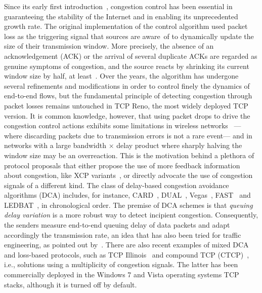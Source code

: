 \documentclass[english,times]{ettauth}
\begin{document}
Since its early first introduction~\cite{Jacobson96,rfc2581}, congestion
control has been essential in guaranteeing the stability of the Internet and
in enabling its unprecedented growth rate. The original implementation of the
control algorithm used packet loss as the triggering signal that sources are
aware~of to dynamically update the size of their transmission window. More
precisely, the absence of an acknowledgement (ACK) or the arrival of several
duplicate ACKs are regarded as genuine symptoms of congestion, and the source
reacts by shrinking its current window size by half, at least~\cite{rfc5681}.
Over the years, the algorithm has undergone several refinements and
modifications in order to control finely the dynamics of end-to-end flows, but
the fundamental principle of detecting congestion through packet losses
remains untouched in TCP Reno, the most widely deployed TCP version. It is
common knowledge, however, that using packet drops to drive the congestion
control actions exhibits some limitations in wireless
networks~\cite{lassila08:_perfor_tcp_low_wirel_links_delay_spikes} ---where
discarding packets due to transmission errors is not a rare event--- and in
networks with a large bandwidth $\times$ delay product where sharply halving
the window size may be an overreaction. This is the motivation behind a
plethora of protocol proposals that either propose the use of more feedback
information about congestion, like XCP
variants~\cite{Katabi02,xia05:_one_more_bit_enoug,wu09:_effic_fair_explic_conges_contr,almeida10:_explic_conges_contr_based_probab_markin},
or directly advocate the use of congestion signals of a different kind. The
class of delay-based congestion avoidance algorithms (DCA) includes, for
instance, CARD~\cite{Jain89}, DUAL~\cite{Wang92}, Vegas~\cite{Brakmo94},
FAST~\cite{Wei06} and LEDBAT~\cite{Shalunov10}, in chronological order. The
premise of DCA schemes is that \emph{queuing delay variation} is a more robust
way to detect incipient congestion. Consequently, the senders measure
end-to-end queuing delay of data packets and adapt accordingly the
transmission rate, an idea that has also been tried for traffic engineering,
as pointed out by~\cite{alparslan11:_tcp_flow_aware_adapt_path}. There are
also recent examples of mixed DCA and loss-based protocols, such as TCP
Illinois~\cite{Liu06} and compound TCP (CTCP)~\cite{Tan06}, i.e., solutions
using a multiplicity of congestion signals. The latter has been commercially
deployed in the Windows 7 and Vista operating systems TCP stacks, although it
is turned off by default.
\end{document}
